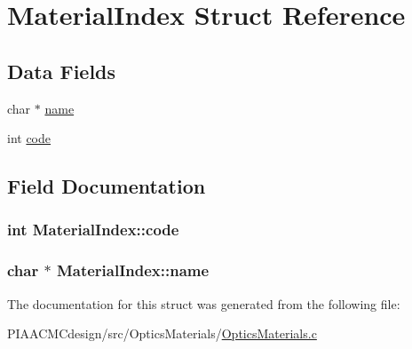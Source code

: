 \hypertarget{structMaterialIndex}{\section{Material\+Index Struct Reference}
\label{structMaterialIndex}
}
\subsection*{Data Fields}
\begin{DoxyCompactItemize}
\item 
char $\ast$ \hyperlink{structMaterialIndex_a98c71e72a670f0415e4adafdb3662d0e}{name}
\item 
int \hyperlink{structMaterialIndex_a7b54b40a48c454c51cc0403b571dce15}{code}
\end{DoxyCompactItemize}


\subsection{Field Documentation}
\hypertarget{structMaterialIndex_a7b54b40a48c454c51cc0403b571dce15}{
\subsubsection[{code}]{\setlength{\rightskip}{0pt plus 5cm}int Material\+Index\+::code}}\label{structMaterialIndex_a7b54b40a48c454c51cc0403b571dce15}
\hypertarget{structMaterialIndex_a98c71e72a670f0415e4adafdb3662d0e}{
\subsubsection[{name}]{\setlength{\rightskip}{0pt plus 5cm}char $\ast$ Material\+Index\+::name}}\label{structMaterialIndex_a98c71e72a670f0415e4adafdb3662d0e}


The documentation for this struct was generated from the following file\+:\begin{DoxyCompactItemize}
\item 
P\+I\+A\+A\+C\+M\+Cdesign/src/\+Optics\+Materials/\hyperlink{PIAACMCdesign_2src_2OpticsMaterials_2OpticsMaterials_8c}{Optics\+Materials.\+c}\end{DoxyCompactItemize}
